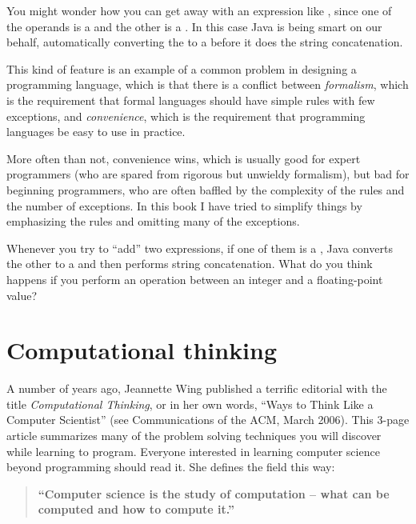 

You might wonder how you can get away with an expression like , since one of the operands is a 
and the other is a .  In this case Java is being
smart on our behalf, automatically converting the  to a
 before it does the string concatenation.

This kind of feature is an example of a common problem in designing a
programming language, which is that there is a conflict between {\em
formalism}, which is the requirement that formal languages should have
simple rules with few exceptions, and {\em convenience}, which is the
requirement that programming languages be easy to use in practice.

More often than not, convenience wins, which is usually good for
expert programmers (who are spared from rigorous but unwieldy
formalism), but bad for beginning programmers, who are often baffled
by the complexity of the rules and the number of exceptions.  In this
book I have tried to simplify things by emphasizing the rules and
omitting many of the exceptions.

Whenever you try to ``add'' two
expressions, if one of them is a , Java converts the
other to a  and then performs string concatenation.
What do you think happens if you perform an operation between
an integer and a floating-point value?


\section{Computational thinking}

A number of years ago, Jeannette Wing published a terrific editorial with the title {\it Computational Thinking}, or in her own words, ``Ways to Think Like a Computer Scientist'' (see Communications of the ACM, March 2006).
This 3-page article summarizes many of the problem solving techniques you will discover while learning to program.
Everyone interested in learning computer science beyond programming should read it.
She defines the field this way:


\begin{quote}
{\bf ``Computer science is the study of computation -- what can be computed and how to compute it.''}
\end{quote}


